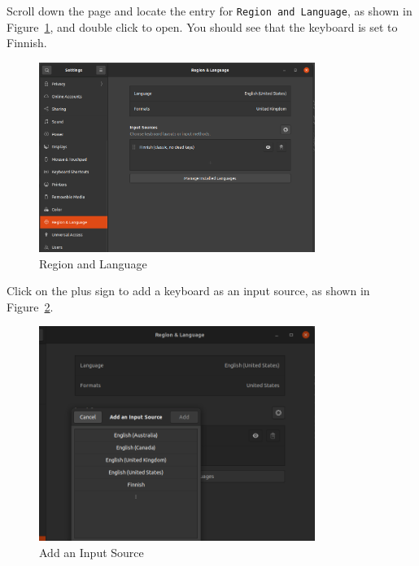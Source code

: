 Scroll down the page and locate the entry for \texttt{Region and Language}, as shown in Figure~\ref{fg:virt-8}, and double click to open.  You should see that the keyboard is set to Finnish.

\begin{figure}[H]
\begin{center}
\includegraphics[width=0.8\textwidth]{virt-8}
\caption{Region and Language}\label{fg:virt-8}
\end{center}
\end{figure}

Click on the plus sign to add a keyboard as an input source, as shown in Figure~\ref{fg:virt-9}.

\begin{figure}[H]
\begin{center}
\includegraphics[width=0.8\textwidth]{virt-9}
\caption{Add an Input Source}\label{fg:virt-9}
\end{center}
\end{figure}

\newpage

